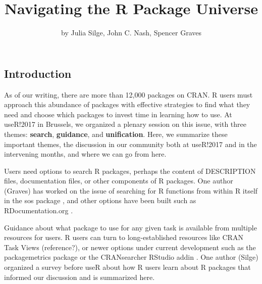 \title{Navigating the R Package Universe}
\author{by Julia Silge, John C. Nash, Spencer Graves}

\maketitle



\hypertarget{introduction}{%
\subsection{Introduction}\label{introduction}}

As of our writing, there are more than 12,000 packages on CRAN. R users
must approach this abundance of packages with effective strategies to
find what they need and choose which packages to invest time in learning
how to use. At useR!2017 in Brussels, we organized a plenary session on
this issue, with three themes: \textbf{search}, \textbf{guidance}, and
\textbf{unification}. Here, we summarize these important themes, the
discussion in our community both at useR!2017 and in the intervening
months, and where we can go from here.

Users need options to search R packages, perhaps the content of
DESCRIPTION files, documentation files, or other components of R
packages. One author (Graves) has worked on the issue of searching for R
functions from within R itself in the sos package \citep{sos}, and other
options have been built such as RDocumentation.org
\citep{rdocumentation}.

Guidance about what package to use for any given task is available from
multiple resources for users. R users can turn to long-established
resources like CRAN Task Views (reference?), or newer options under
current development such as the packagemetrics package
\citep{packagemetrics} or the CRANsearcher RStudio addin
\citep{cransearcher}. One author (Silge) organized a survey before useR
about how R users learn about R packages that informed our discussion
and is summarized here.

